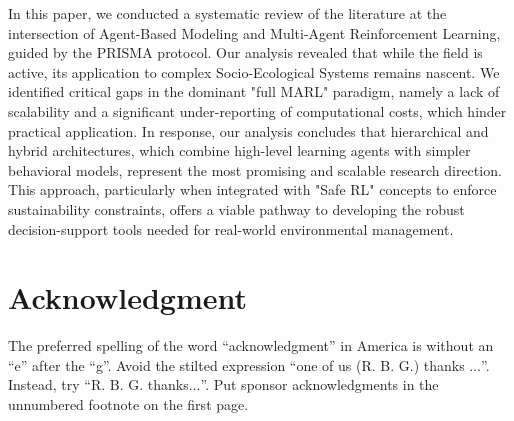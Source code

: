 \documentclass[conference]{IEEEtran}
\begin{document}
In this paper, we conducted a systematic review of the literature at the intersection of Agent-Based Modeling and Multi-Agent Reinforcement Learning, guided by the PRISMA protocol. Our analysis revealed that while the field is active, its application to complex Socio-Ecological Systems remains nascent. We identified critical gaps in the dominant "full MARL" paradigm, namely a lack of scalability and a significant under-reporting of computational costs, which hinder practical application. In response, our analysis concludes that hierarchical and hybrid architectures, which combine high-level learning agents with simpler behavioral models, represent the most promising and scalable research direction. This approach, particularly when integrated with "Safe RL" concepts to enforce sustainability constraints, offers a viable pathway to developing the robust decision-support tools needed for real-world environmental management.

\section*{Acknowledgment}

The preferred spelling of the word ``acknowledgment'' in America is without 
an ``e'' after the ``g''. Avoid the stilted expression ``one of us (R. B. 
G.) thanks $\ldots$''. Instead, try ``R. B. G. thanks$\ldots$''. Put sponsor 
acknowledgments in the unnumbered footnote on the first page.





\end{document}
